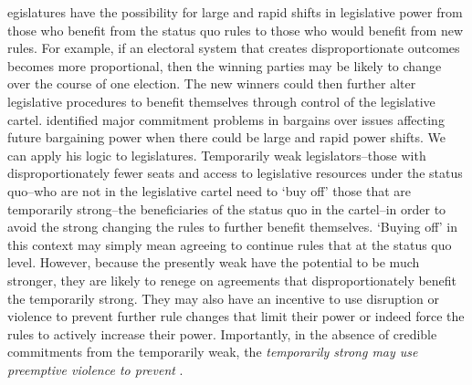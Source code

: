 \documentclass[a4paper]{article}\usepackage[]{graphicx}\usepackage[]{color}
\begin{document}
egislatures have the possibility for large and rapid shifts in legislative power from those who benefit from the status quo rules to those who would benefit from new rules. For example, if an electoral system that creates disproportionate outcomes becomes more proportional, then the winning parties may be likely to change over the course of one election. The new winners could then further alter legislative procedures to benefit themselves through control of the legislative cartel. \cite{Powell2004,Powell2006} identified major commitment problems in bargains over issues affecting future bargaining power when there could be large and rapid power shifts. We can apply his logic to legislatures. Temporarily weak legislators--those with disproportionately fewer seats and access to legislative resources under the status quo--who are not in the legislative cartel need to `buy off' those that are temporarily strong--the beneficiaries of the status quo in the cartel--in order to avoid the strong changing the rules to further benefit themselves. `Buying off' in this context may simply mean agreeing to continue rules that  at the status quo level. However, because the presently weak have the potential to be much stronger, they are likely to renege on agreements that disproportionately benefit the temporarily strong. They may also have an incentive to use disruption or violence to prevent further rule changes that limit their power or indeed force the rules to   actively increase their power. Importantly, in the absence of credible commitments from the temporarily weak, the \emph{temporarily strong may use preemptive violence to prevent }.
\end{document}
